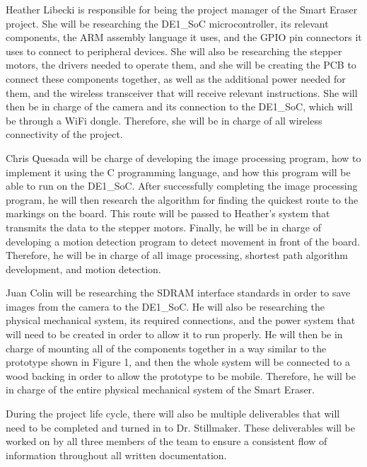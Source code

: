 \setlength{\parindent}{2.5ex} Heather Libecki is responsible for being the project manager of the Smart Eraser project. She will be researching the DE1\_SoC microcontroller, its relevant components, the ARM assembly language it uses, and the GPIO pin connectors it uses to connect to peripheral devices. She will also be researching the stepper motors, the drivers needed to operate them, and she will be creating the PCB to connect these components together, as well as the additional power needed for them, and the wireless transceiver that will receive relevant instructions. She will then be in charge of the camera and its connection to the DE1\_SoC, which will be through a WiFi dongle. Therefore, she will be in charge of all wireless connectivity of the project. \par
\setlength{\parindent}{2.5ex} Chris Quesada will be charge of developing the image processing program, how to implement it using the C programming language, and how this program will be able to run on the DE1\_SoC. After successfully completing the image processing program, he will then research the algorithm for finding the quickest route to the markings on the board. This route will be passed to Heather’s system that transmits the data to the stepper motors.  Finally, he will be in charge of developing a motion detection program to detect movement in front of the board. Therefore, he will be in charge of all image processing, shortest path algorithm development, and motion detection.
 \par
\setlength{\parindent}{2.5ex} Juan Colin will be researching the SDRAM interface standards in order to save images from the camera to the DE1\_SoC. He will also be researching the physical mechanical system, its required connections, and the power system that will need to be created in order to allow it to run properly. He will then be in charge of mounting all of the components together in a way similar to the prototype shown in Figure 1, and then the whole system will be connected to a wood backing in order to allow the prototype to be mobile. Therefore, he will be in charge of the entire physical mechanical system of the Smart Eraser.
 \par
\setlength{\parindent}{2.5ex}During the project life cycle, there will also be multiple deliverables that will need to be completed and turned in to Dr. Stillmaker. These deliverables will be worked on by all three members of the team to ensure a consistent flow of information throughout all written documentation.
 
